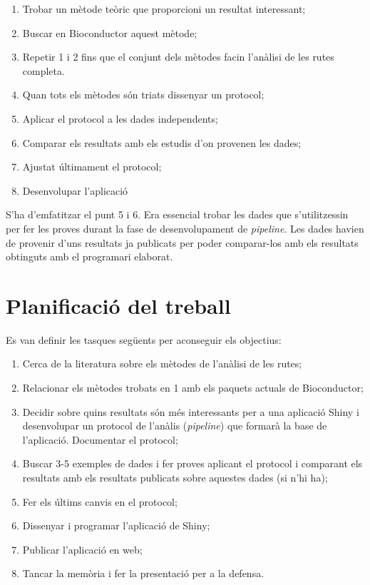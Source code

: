 \begin{enumerate}
\item Trobar un mètode teòric que proporcioni un resultat interessant;
\item Buscar en \gls{Bioconductor} aquest mètode;
\item Repetir 1 i 2 fins que el conjunt dels mètodes facin l'anàlisi de les rutes completa. 
\item Quan tots els mètodes són triats dissenyar un protocol;
\item Aplicar el protocol a les dades independents;
\item Comparar els resultats amb els estudis d'on provenen les dades;
\item Ajustat últimament el protocol;
\item Desenvolupar l'aplicació
\end{enumerate}
S'ha d'emfatitzar el punt 5 i 6. Era essencial trobar les dades que s'utilitzessin per fer les proves durant la fase de desenvolupament de \textit{pipeline}. Les dades havien de provenir d'uns resultats ja publicats per poder comparar-los amb els resultats obtinguts amb el programari elaborat. 

\section{Planificació del treball}

Es van definir les tasques següents per aconseguir els objectius:

\begin{enumerate}
\item Cerca de la literatura sobre els mètodes de l'anàlisi de les rutes;
\item Relacionar els mètodes trobats en 1 amb els paquets actuals de \gls{Bioconductor};
\item Decidir sobre quins resultats són més interessants per a una aplicació Shiny i desenvolupar un protocol de l'anàlis (\textit{pipeline}) que formarà la base de l'aplicació. Documentar el protocol;
\item Buscar 3-5 exemples de dades i fer proves aplicant el protocol i comparant els resultats amb els resultats publicats sobre aquestes dades (si n'hi ha);
\item Fer els últims canvis en el protocol;
\item Dissenyar i programar l'aplicació de Shiny;
\item Publicar l'aplicació en web;
\item Tancar la memòria i fer la presentació per a la defensa.
\end{enumerate}

